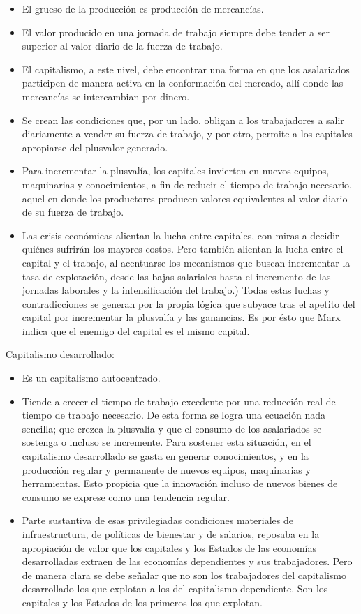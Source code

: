 \documentclass[
  letterpaper,
  DIV=11,
  numbers=noendperiod]{scrreprt}
\begin{document}
\begin{itemize}
\item
  El grueso de la producción es producción de mercancías.
\item
  El valor producido en una jornada de trabajo siempre debe tender a ser
  superior al valor diario de la fuerza de trabajo.
\item
  El capitalismo, a este nivel, debe encontrar una forma en que los
  asalariados participen de manera activa en la conformación del
  mercado, allí donde las mercancías se intercambian por dinero.
\item
  Se crean las condiciones que, por un lado, obligan a los trabajadores
  a salir diariamente a vender su fuerza de trabajo, y por otro, permite
  a los capitales apropiarse del plusvalor generado.
\item
  Para incrementar la plusvalía, los capitales invierten en nuevos
  equipos, maquinarias y conocimientos, a fin de reducir el tiempo de
  trabajo necesario, aquel en donde los productores producen valores
  equivalentes al valor diario de su fuerza de trabajo.
\item
  Las crisis económicas alientan la lucha entre capitales, con miras a
  decidir quiénes sufrirán los mayores costos. Pero también alientan la
  lucha entre el capital y el trabajo, al acentuarse los mecanismos que
  buscan incrementar la tasa de explotación, desde las bajas salariales
  hasta el incremento de las jornadas laborales y la intensificación del
  trabajo.) Todas estas luchas y contradicciones se generan por la
  propia lógica que subyace tras el apetito del capital por incrementar
  la plusvalía y las ganancias. Es por ésto que Marx indica que el
  enemigo del capital es el mismo capital.
\end{itemize}

Capitalismo desarrollado:

\begin{itemize}
\item
  Es un capitalismo autocentrado.
\item
  Tiende a crecer el tiempo de trabajo excedente por una reducción real
  de tiempo de trabajo necesario. De esta forma se logra una ecuación
  nada sencilla; que crezca la plusvalía y que el consumo de los
  asalariados se sostenga o incluso se incremente. Para sostener esta
  situación, en el capitalismo desarrollado se gasta en generar
  conocimientos, y en la producción regular y permanente de nuevos
  equipos, maquinarias y herramientas. Esto propicia que la innovación
  incluso de nuevos bienes de consumo se exprese como una tendencia
  regular.
\item
  Parte sustantiva de esas privilegiadas condiciones materiales de
  infraestructura, de políticas de bienestar y de salarios, reposaba en
  la apropiación de valor que los capitales y los Estados de las
  economías desarrolladas extraen de las economías dependientes y sus
  trabajadores. Pero de manera clara se debe señalar que no son los
  trabajadores del capitalismo desarrollado los que explotan a los del
  capitalismo dependiente. Son los capitales y los Estados de los
  primeros los que explotan.
\end{itemize}
\end{document}
